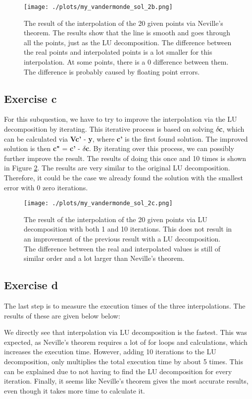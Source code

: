 \begin{figure}[h!]
  \centering
  \texttt{[image: ./plots/my\_vandermonde\_sol\_2b.png]}
  \caption{The result of the interpolation of the 20 given points via Neville's theorem. The results show that the line is smooth and goes through all the points, just as the LU decomposition. The difference between the real points and interpolated points is a lot smaller for this interpolation. At some points, there is a 0 difference between them. The difference is probably caused by floating point errors.}
  \label{fig:2b}
\end{figure}

\subsection{Exercise c}
For this subquestion, we have to try to improve the interpolation via the LU decomposition by iterating. This iterative process is based on solving \textbf{$\delta$c}, which can be calculated via \textbf{Vc'} - \textbf{y}, where \textbf{c'} is the first found solution. The improved solution is then \textbf{c"} = \textbf{c'} - \textbf{$\delta$c}. By iterating over this process, we can possibly further improve the result. The results of doing this once and 10 times is shown in Figure \ref{fig:2c}. The results are very similar to the original LU decomposition. Therefore, it could be the case we already found the solution with the smallest error with 0 zero iterations.

\begin{figure}[h!]
  \centering
  \texttt{[image: ./plots/my\_vandermonde\_sol\_2c.png]}
  \caption{The result of the interpolation of the 20 given points via LU decomposition with both 1 and 10 iterations. This does not result in an improvement of the previous result with a LU decomposition. The difference between the real and interpolated values is still of similar order and a lot larger than Neville's theorem.}
  \label{fig:2c}
\end{figure}

\subsection{Exercise d}

The last step is to measure the execution times of the three interpolations. The results of these are given below below: 

We directly see that interpolation via LU decomposition is the fastest. This was expected, as Neville's theorem requires a lot of for loops and calculations, which increases the execution time. However, adding 10 iterations to the LU decomposition, only multiplies the total execution time by about 5 times. This can be explained due to not having to find the LU decomposition for every iteration. Finally, it seems like Neville's theorem gives the most accurate results, even though it takes more time to calculate it. 

